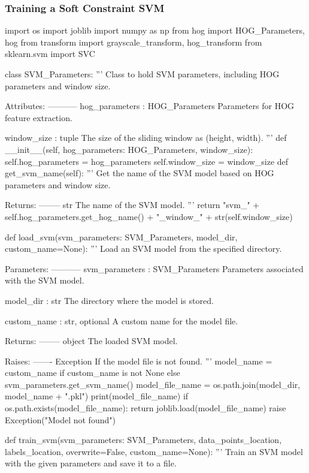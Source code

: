 \subsubsection{Training a Soft Constraint SVM}
\begin{pythoncode}
import os
import joblib
import numpy as np
from hog import HOG_Parameters, hog
from transform import grayscale_transform, hog_transform
from sklearn.svm import SVC

class SVM_Parameters:
    '''
    Class to hold SVM parameters, including HOG parameters and window size.

    Attributes:
    -----------
    hog_parameters : HOG_Parameters
        Parameters for HOG feature extraction.
    
    window_size : tuple
        The size of the sliding window as (height, width).
    '''
    def __init__(self, hog_parameters: HOG_Parameters, window_size):
        self.hog_parameters = hog_parameters
        self.window_size = window_size
    def get_svm_name(self):
        '''
        Get the name of the SVM model based on HOG parameters and window size.

        Returns:
        --------
        str
            The name of the SVM model.
        '''
        return "svm_" + self.hog_parameters.get_hog_name() + "_window_" + str(self.window_size)

def load_svm(svm_parameters: SVM_Parameters, model_dir, custom_name=None):
    '''
    Load an SVM model from the specified directory.

    Parameters:
    -----------
    svm_parameters : SVM_Parameters
        Parameters associated with the SVM model.
    
    model_dir : str
        The directory where the model is stored.
    
    custom_name : str, optional
        A custom name for the model file.

    Returns:
    --------
    object
        The loaded SVM model.
    
    Raises:
    -------
    Exception
        If the model file is not found.
    '''
    model_name = custom_name if custom_name is not None else svm_parameters.get_svm_name()
    model_file_name = os.path.join(model_dir, model_name + ".pkl")
    print(model_file_name)
    if os.path.exists(model_file_name):
        return joblib.load(model_file_name)
    raise Exception("Model not found")

def train_svm(svm_parameters: SVM_Parameters, data_points_location, labels_location, overwrite=False, custom_name=None):
    '''
    Train an SVM model with the given parameters and save it to a file.


\end{pythoncode}
